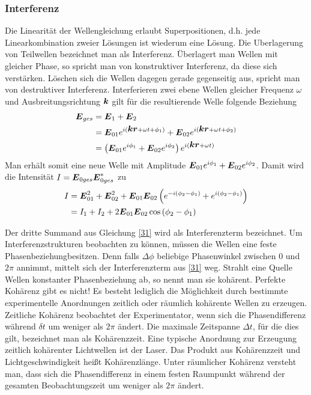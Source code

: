 \documentclass[12pt]{article}
\renewcommand*\vec[1]{{\mbox{\boldmath\ensuremath{#1}}}}
\begin{document}
\subsubsection{Interferenz}
Die Linearität der Wellengleichung erlaubt Superpositionen, d.h. jede Linearkombination zweier Lösungen ist wiederum eine Lösung. Die Uberlagerung von Teilwellen bezeichnet man als Interferenz. Überlagert man Wellen mit gleicher Phase, so spricht man von
konstruktiver Interferenz, da diese sich verstärken. Löschen sich die Wellen dagegen gerade gegenseitig
aus, spricht man von destruktiver Interferenz.
Interferieren zwei ebene Wellen gleicher Frequenz $\omega$ und Ausbreitungsrichtung $\vec k$ gilt für die
resultierende Welle folgende Beziehung
\begin{align}
 \vec E_{ges} &= \vec E_1 + \vec E_2 \\
&= \vec E_{01} e^{i(\vec k \vec r + \omega t + \phi_1)} + \vec E_{02} e^{i(\vec k \vec r + \omega t + \phi_2)} \\
&= \left( \vec E_{01} e^{i\phi_1} + \vec E_{02} e^{i\phi_2} \right) e^{i(\vec k \vec r + \omega t)}
\end{align}
Man erhält somit eine neue Welle mit Amplitude $\vec E_{01} e^{i\phi_1} + \vec E_{02} e^{i\phi_2}$. Damit wird die
Intensität $I= \vec E_{0ges}\vec E^*_{0ges}$ zu
\begin{align}
 I &= \vec E^2_{01} + \vec E^2_{02} + \vec E_{01}\vec E_{02} \left( e^{-i(\phi_2 - \phi_1)} + e^{i(\phi_2 - \phi_1)}\right) \\
\label{31} &= I_1 + I_2 + 2\vec E_{01}\vec E_{02} \cos{(\phi_2 - \phi_1)}
\end{align}

Der dritte Summand aus Gleichung \ref{31} wird als Interferenzterm bezeichnet.
Um Interferenzstrukturen beobachten zu können, müssen die Wellen eine feste Phasenbeziehungbesitzen.
Denn falls $\Delta\phi$ beliebige Phasenwinkel zwischen $0$ und $2\pi$ annimmt, mittelt sich der
Interferenzterm aus \ref{31} weg. Strahlt eine Quelle Wellen konstanter Phasenbeziehung ab, so
nennt man sie kohärent. Perfekte Kohärenz gibt es nicht! Es besteht
lediglich die Möglichkeit durch bestimmte experimentelle Anordnungen zeitlich oder räumlich
kohärente Wellen zu erzeugen.
Zeitliche Kohärenz beobachtet der Experimentator, wenn sich die Phasendifferenz während $\delta t$
um weniger als $2\pi$ ändert. Die maximale Zeitspanne $\Delta t$, für die dies gilt, bezeichnet man als
Kohärenzzeit. Eine typische Anordnung zur Erzeugung zeitlich kohärenter Lichtwellen ist der
Laser. Das Produkt aus Kohärenzzeit und Lichtgeschwindigkeit heißt Kohärenzlänge.
Unter räumlicher Kohärenz versteht man, dass sich die Phasendifferenz in einem festen Raumpunkt während der
gesamten Beobachtungszeit um weniger als $2\pi$ ändert. 
\end{document}
